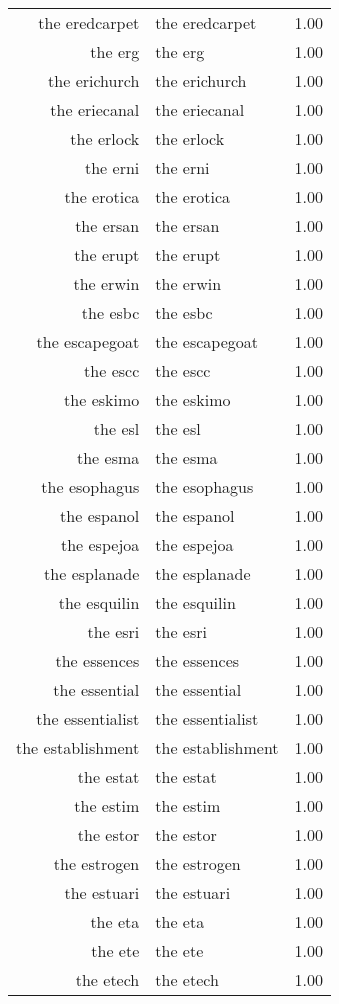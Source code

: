 \begin{table}[ht]
\begin{tabular}{rlr}
  the eredcarpet & the eredcarpet & 1.00 \\ 
  the erg & the erg & 1.00 \\ 
  the erichurch & the erichurch & 1.00 \\ 
  the eriecanal & the eriecanal & 1.00 \\ 
  the erlock & the erlock & 1.00 \\ 
  the erni & the erni & 1.00 \\ 
  the erotica & the erotica & 1.00 \\ 
  the ersan & the ersan & 1.00 \\ 
  the erupt & the erupt & 1.00 \\ 
  the erwin & the erwin & 1.00 \\ 
  the esbc & the esbc & 1.00 \\ 
  the escapegoat & the escapegoat & 1.00 \\ 
  the escc & the escc & 1.00 \\ 
  the eskimo & the eskimo & 1.00 \\ 
  the esl & the esl & 1.00 \\ 
  the esma & the esma & 1.00 \\ 
  the esophagus & the esophagus & 1.00 \\ 
  the espanol & the espanol & 1.00 \\ 
  the espejoa & the espejoa & 1.00 \\ 
  the esplanade & the esplanade & 1.00 \\ 
  the esquilin & the esquilin & 1.00 \\ 
  the esri & the esri & 1.00 \\ 
  the essences & the essences & 1.00 \\ 
  the essential & the essential & 1.00 \\ 
  the essentialist & the essentialist & 1.00 \\ 
  the establishment & the establishment & 1.00 \\ 
  the estat & the estat & 1.00 \\ 
  the estim & the estim & 1.00 \\ 
  the estor & the estor & 1.00 \\ 
  the estrogen & the estrogen & 1.00 \\ 
  the estuari & the estuari & 1.00 \\ 
  the eta & the eta & 1.00 \\ 
  the ete & the ete & 1.00 \\ 
  the etech & the etech & 1.00 \\ 

\end{tabular}
\end{table}
